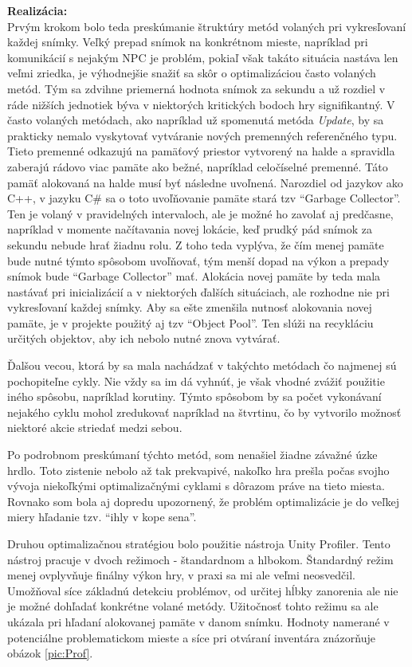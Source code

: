 \documentclass[slovak, bachelorpractice]{diploma}
\begin{document}
\textbf{Realizácia:} \\ Prvým krokom bolo teda preskúmanie štruktúry metód volaných pri vykresľovaní každej snímky. Veľký prepad snímok na konkrétnom mieste, napríklad pri komunikácií s nejakým NPC je problém,  pokiaľ však takáto situácia nastáva len veľmi zriedka, je výhodnejšie snažiť sa skôr o optimalizáciou často volaných metód. Tým sa zdvihne priemerná hodnota snímok za sekundu a už rozdiel v ráde nižších jednotiek býva v niektorých kritických bodoch hry signifikantný. V často volaných metódach, ako napríklad už spomenutá metóda \textit{Update}, by sa prakticky nemalo vyskytovať vytváranie nových premenných referenčného typu. Tieto premenné odkazujú na pamäťový priestor vytvorený na halde a spravidla zaberajú rádovo viac pamäte ako bežné, napríklad celočíselné premenné. Táto pamäť alokovaná na halde musí byť následne uvoľnená. Narozdiel od jazykov ako C++, v jazyku C\# sa o toto uvoľňovanie pamäte stará tzv \enquote{Garbage Collector}. Ten je volaný v pravidelných intervaloch, ale je možné ho zavolať aj predčasne, napríklad v momente načítavania novej lokácie, keď prudký pád snímok za sekundu nebude hrať žiadnu rolu. Z toho teda vyplýva, že čím menej pamäte bude nutné týmto spôsobom uvoľňovať, tým menší dopad na výkon a prepady snímok bude \enquote{Garbage Collector} mať. Alokácia novej pamäte by teda mala nastávať pri inicializácií a v niektorých ďalších situáciach, ale rozhodne nie pri vykresľovaní každej snímky. Aby sa ešte zmenšila nutnosť alokovania novej pamäte, je v projekte použitý aj tzv \enquote{Object Pool}. Ten slúži na recykláciu určitých objektov, aby ich nebolo nutné znova vytvárať. 

Ďalšou vecou, ktorá by sa mala nachádzať v takýchto metódach čo najmenej sú pochopiteľne cykly. Nie vždy sa im dá vyhnúť, je však vhodné zvážiť použitie iného spôsobu, napríklad korutiny. Týmto spôsobom by sa počet vykonávaní nejakého cyklu mohol zredukovať napríklad na štvrtinu, čo by vytvorilo možnosť niektoré akcie striedať medzi sebou.

Po podrobnom preskúmaní týchto metód, som nenašiel žiadne závažné úzke hrdlo. Toto zistenie nebolo až tak prekvapivé, nakoľko hra prešla počas svojho vývoja niekoľkými optimalizačnými cyklami s dôrazom práve na tieto miesta. Rovnako som bola aj dopredu upozornený, že problém optimalizácie je do veľkej miery hľadanie tzv. \enquote{ihly v kope sena}.

Druhou optimalizačnou stratégiou bolo použitie nástroja Unity Profiler. Tento nástroj pracuje v dvoch režimoch - štandardnom a hlbokom. Štandardný režim menej ovplyvňuje finálny výkon hry, v praxi sa mi ale veľmi neosvedčil. Umožňoval síce základnú detekciu problémov, od určitej hĺbky zanorenia ale nie je možné dohľadať konkrétne volané metódy. Užitočnosť tohto režimu sa ale ukázala pri hľadaní alokovanej pamäte v danom snímku. Hodnoty namerané v potenciálne problematickom mieste a síce pri otváraní inventára znázorňuje obázok \ref{pic:Prof}.
\end{document}
